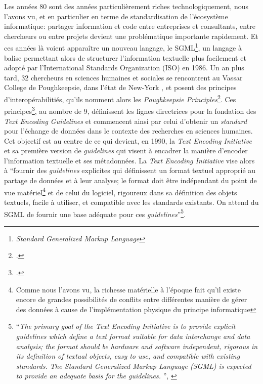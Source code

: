 Les années 80 sont des années particulièrement riches technologiquement, nous l'avons vu, et en particulier en terme de standardisation de l'écosystème informatique: partager information et code entre entreprises et consultants, entre chercheurs ou entre projets devient une problématique importante rapidement. Et ces années là voient apparaître un nouveau langage, le SGML\footnote{\textit{Standard Generalized Markup Language}}, un langage à balise permettant alors de structurer l'information textuelle plus facilement et adopté par l'International Standards Organization (ISO) en 1986. Un an plus tard, 32 chercheurs en sciences humaines et sociales se rencontrent au Vassar College de Poughkeepsie, dans l'état de New-York , et posent des principes d'interopérabilitiés, qu'ils nomment alors les \textit{Poughkeepsie Principles}\footcite{vanhoutte_introduction_2004}. Ces principes\footcite{noauthor_design_1988}, au nombre de 9, définissent les lignes directrices pour la fondation des \textit{Text Encoding Guidelines} et commencent ainsi par celui d'obtenir un \textit{standard} pour l'échange de données dans le contexte des recherches en sciences humaines. Cet objectif est au centre de ce qui devient, en 1990, la \textit{Text Encoding Initiative} et sa première version de \textit{guidelines} qui visent à encadrer la manière d'encoder l'information textuelle et ses métadonnées. La \textit{Text Encoding Initiative} vise alors à \enquote{fournir des \textit{guidelines} explicites qui définissent un format textuel approprié au partage de données et à leur analyse; le format doit être indépendant du point de vue matériel\footnote{Comme nous l'avons vu, la richesse matérielle à l'époque fait qu'il existe encore de grandes possibilités de conflits entre différentes manière de gérer des données à cause de l'implémentation physique du principe informatique} et de celui du logiciel, rigoureux dans sa définition des objets textuels, facile à utiliser, et compatible avec les standards existants. On attend du SGML de fournir une base adéquate pour ces \textit{guidelines}}\footnote{\enquote{\textit{The primary goal of the Text Encoding Initiative is to provide explicit guidelines which define a text format suitable for data interchange and data analysis; the format should be hardware and software independent, rigorous in its definition of textual objects, easy to use, and compatible with existing standards. The Standard Generalized Markup Language (SGML) is expected to provide an adequate basis for the guidelines. }}, \cite{noauthor_design_1988}}.

